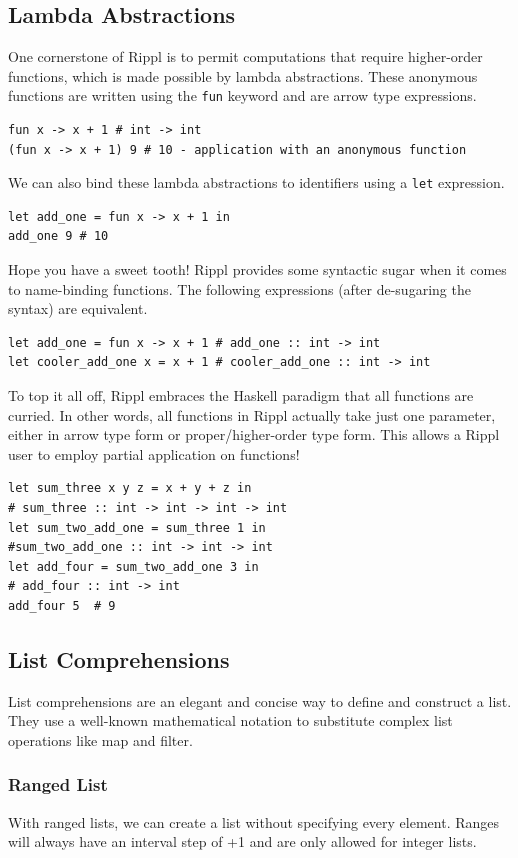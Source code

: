 \documentclass[5pt]{article}
\begin{document}
\subsection{Lambda Abstractions}
One cornerstone of Rippl is to permit computations that require higher-order functions, which is made possible by lambda abstractions. These anonymous functions are written using the \texttt{fun} keyword and are arrow type expressions.
\begin{lstlisting}[language=rippl]
fun x -> x + 1 # int -> int
(fun x -> x + 1) 9 # 10 - application with an anonymous function
\end{lstlisting}
We can also bind these lambda abstractions to identifiers using a \texttt{let} expression. 
\begin{lstlisting}[language=rippl]
let add_one = fun x -> x + 1 in
add_one 9 # 10
\end{lstlisting}
Hope you have a sweet tooth! Rippl provides some syntactic sugar when it comes to name-binding functions. The following expressions (after de-sugaring the syntax) are equivalent.
\begin{lstlisting}[language=rippl]
let add_one = fun x -> x + 1 # add_one :: int -> int
let cooler_add_one x = x + 1 # cooler_add_one :: int -> int
\end{lstlisting}
To top it all off, Rippl embraces the Haskell paradigm that all functions are curried. In other words, all functions in Rippl actually take just one parameter, either in arrow type form or proper/higher-order type form. This allows a Rippl user to employ partial application on functions!
\begin{lstlisting}[language=rippl]
let sum_three x y z = x + y + z in
# sum_three :: int -> int -> int -> int
let sum_two_add_one = sum_three 1 in
#sum_two_add_one :: int -> int -> int
let add_four = sum_two_add_one 3 in 
# add_four :: int -> int
add_four 5  # 9
\end{lstlisting}

\subsection{List Comprehensions}
List comprehensions are an elegant and concise way to define and construct a list. They use a well-known mathematical notation to substitute complex list operations like map and filter. \\


\subsubsection{Ranged List}
With ranged lists, we can create a list without specifying every element. Ranges will always have an interval step of +1 and are only allowed for integer lists. 
\end{document}
